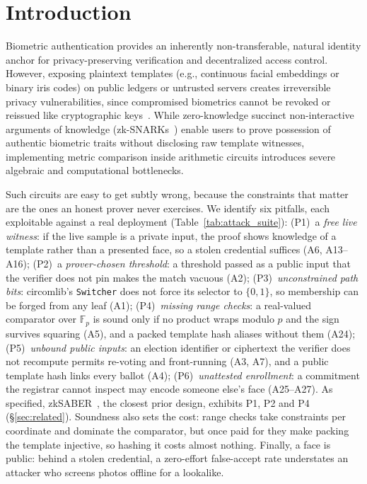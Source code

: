 \documentclass[10pt,letterpaper,journal]{IEEEtran}
\begin{document}
\section{Introduction}
\label{sec:intro}

Biometric authentication provides an inherently non-transferable, natural identity anchor for privacy-preserving verification and decentralized access control. However, exposing plaintext templates (e.g., continuous facial embeddings or binary iris codes) on public ledgers or untrusted servers creates irreversible privacy vulnerabilities, since compromised biometrics cannot be revoked or reissued like cryptographic keys~\cite{Jain2008,Rathgeb2011}. While zero-knowledge succinct non-interactive arguments of knowledge (zk-SNARKs~\cite{Groth2016}) enable users to prove possession of authentic biometric traits without disclosing raw template witnesses, implementing metric comparison inside arithmetic circuits introduces severe algebraic and computational bottlenecks.

Such circuits are easy to get subtly wrong, because the constraints that matter are the ones an honest prover never exercises. We identify six pitfalls, each exploitable against a real deployment (Table~\ref{tab:attack_suite}):
(P1)~a \emph{free live witness}: if the live sample is a private input, the proof shows knowledge of a template rather than a presented face, so a stolen credential suffices (A6, A13--A16);
(P2)~a \emph{prover-chosen threshold}: a threshold passed as a public input that the verifier does not pin makes the match vacuous (A2);
(P3)~\emph{unconstrained path bits}: circomlib's \texttt{Switcher} does not force its selector to $\{0,1\}$, so membership can be forged from any leaf (A1);
(P4)~\emph{missing range checks}: a real-valued comparator over $\mathbb{F}_p$ is sound only if no product wraps modulo $p$ and the sign survives squaring (A5), and a packed template hash aliases without them (A24);
(P5)~\emph{unbound public inputs}: an election identifier or ciphertext the verifier does not recompute permits re-voting and front-running (A3, A7), and a public template hash links every ballot (A4);
(P6)~\emph{unattested enrollment}: a commitment the registrar cannot inspect may encode someone else's face (A25--A27).
As specified, zkSABER~\cite{zkSABER2025}, the closest prior design, exhibits P1, P2 and P4 (\S\ref{sec:related}). Soundness also sets the cost: range checks take \nRangePerCoord{} constraints per coordinate and dominate the comparator, but once paid for they make packing the template injective, so hashing it costs almost nothing. Finally, a face is public: behind a stolen credential, a zero-effort false-accept rate understates an attacker who screens photos offline for a lookalike.
\end{document}
